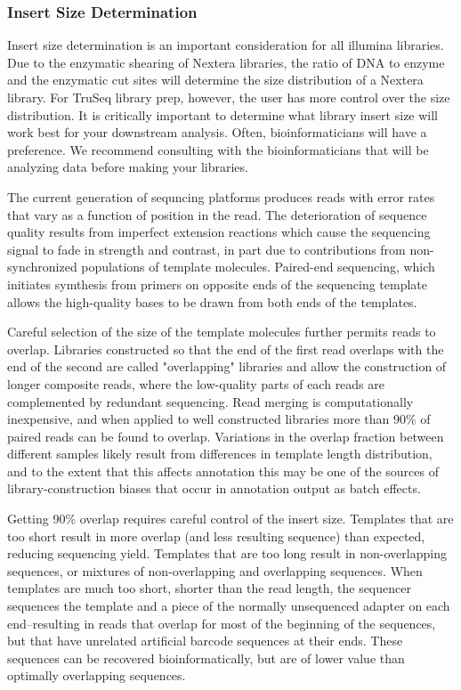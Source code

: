 \documentclass[graybox]{svmult}
\begin{document}
\subsubsection{ Insert Size Determination}

Insert size determination is an important consideration for all illumina libraries.  Due to the enzymatic shearing of Nextera libraries, the ratio of DNA to enzyme and the enzymatic cut sites will determine the size distribution of a Nextera library.  For TruSeq library prep, however, the user has more control over the size distribution.  It is critically important to determine what library insert size will work best for your downstream analysis. Often, bioinformaticians will have a preference. We recommend consulting with the bioinformaticians that will be analyzing data before making your libraries. 

        The current generation of sequncing platforms produces reads with error rates that vary as a function of position in the read.  The deterioration of sequence quality results from imperfect extension reactions which cause the sequencing signal to fade in strength and contrast, in part due to contributions from non-synchronized populations of template molecules.  Paired-end sequencing, which initiates symthesis from primers on opposite ends of the sequencing template allows the high-quality bases to be drawn from both ends of the templates.  

Careful selection of the size of the template molecules further permits reads to overlap.  Libraries constructed so that the end of the first read overlaps with the end of the second are called "overlapping" libraries and allow the construction of longer composite reads, where the low-quality parts of each reads are complemented by redundant sequencing.  Read merging is computationally inexpensive, and when applied to well constructed libraries more than 90\% of paired reads can be found to overlap.  Variations in the overlap fraction between different samples likely result from differences in template length distribution, and to the extent that this affects annotation this may be one of the sources of library-construction biases that occur in annotation output as batch effects.
        
Getting 90\% overlap requires careful control of the insert size.  Templates that are too short result in more overlap (and less resulting sequence) than expected, reducing sequencing yield.  Templates that are too long result in non-overlapping sequences, or mixtures of non-overlapping and overlapping sequences.   When templates are much too short, shorter than the read length, the sequencer sequences the template and a piece of the normally unsequenced adapter on each end--resulting in reads that overlap for most of the beginning of the sequences, but that have unrelated artificial barcode sequences at their ends.   These sequences can be recovered bioinformatically, but are of lower value than optimally overlapping sequences.
\end{document}
